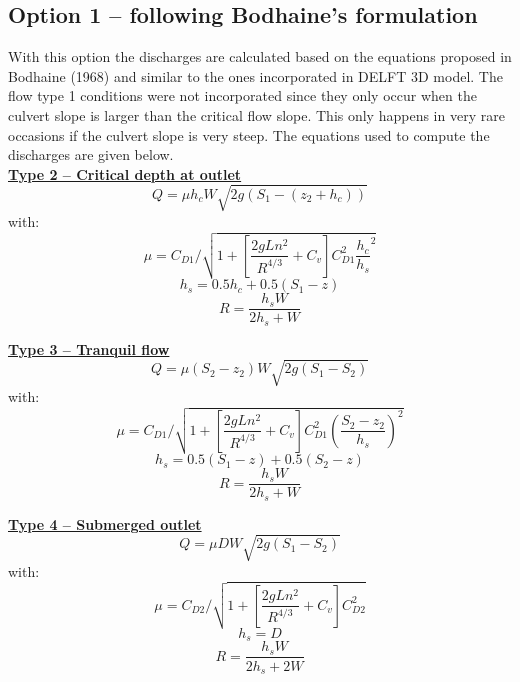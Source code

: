 \subsection{Option 1 -- following Bodhaine's formulation}

With this option the discharges are calculated based on the equations proposed in Bodhaine (1968) 
and similar to the ones incorporated in DELFT 3D model. 
The flow type 1 conditions were not incorporated since they only 
occur when the culvert slope is larger than the critical flow slope. 
This only happens in very rare occasions if the culvert slope is very steep.
The equations used to compute the discharges are given below.\\

\underline{\textbf{Type 2 -- Critical depth at outlet}}\\
\begin{equation}
Q = \mu h_c W \sqrt{2g(S_1-(z_2+h_c))}
\end{equation}
with:
\begin{equation}
\mu = C_{D1}/\sqrt{1+\left[\dfrac{2gLn^2}{R^{4/3}} +C_v\right] C_{D1}^2 \dfrac{h_c}{h_s}^2}
\end{equation}
\begin{equation}
h_s=0.5h_c+0.5(S_1-z)
\end{equation}
\begin{equation}
R=\dfrac{h_s W}{2h_s+W}
\end{equation}

\underline{\textbf{Type 3 -- Tranquil flow}}\\
\begin{equation}
Q=\mu (S_2-z_2)W\sqrt{2g(S_1-S_2 )}
\end{equation}
with:
\begin{equation}
\mu = C_{D1}/\sqrt{ 1+\left[\dfrac{2gLn^2}{R^{4/3}} +C_v \right] C_{D1}^2 \left(\dfrac{S_2-z_2}{h_s}\right)^2}
\end{equation}
\begin{equation}
h_s=0.5(S_1-z)+0.5(S_2-z)
\end{equation}
\begin{equation}		
  R=\dfrac{h_sW}{2h_s+W}
\end{equation}

\underline{\textbf{Type 4 -- Submerged outlet}}\\
\begin{equation}
Q =\mu D W \sqrt{2g(S_1-S_2)}
\end{equation}
with:
\begin{equation}
\mu = C_{D2}/\sqrt{1+\left[\dfrac{2gLn^2}{R^{4/3}} +C_v \right] C_{D2}^2}
\end{equation}
\begin{equation}
h_s=D
\end{equation}
\begin{equation}									
R=\dfrac{h_s W}{2h_s+2W}
\end{equation}

